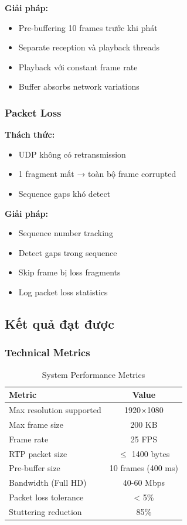 \textbf{Giải pháp:}
\begin{itemize}
    \item Pre-buffering 10 frames trước khi phát
    \item Separate reception và playback threads
    \item Playback với constant frame rate
    \item Buffer absorbs network variations
\end{itemize}

\subsubsection{Packet Loss}

\textbf{Thách thức:}
\begin{itemize}
    \item UDP không có retransmission
    \item 1 fragment mất → toàn bộ frame corrupted
    \item Sequence gaps khó detect
\end{itemize}

\textbf{Giải pháp:}
\begin{itemize}
    \item Sequence number tracking
    \item Detect gaps trong sequence
    \item Skip frame bị loss fragments
    \item Log packet loss statistics
\end{itemize}

\subsection{Kết quả đạt được}

\subsubsection{Technical Metrics}

\begin{table}[H]
\centering
\begin{tabular}{|l|c|}
\hline
\textbf{Metric} & \textbf{Value} \\
\hline
Max resolution supported & 1920$\times$1080 \\
Max frame size & 200 KB \\
Frame rate & 25 FPS \\
RTP packet size & $\leq$ 1400 bytes \\
Pre-buffer size & 10 frames (400 ms) \\
Bandwidth (Full HD) & 40-60 Mbps \\
Packet loss tolerance & < 5\% \\
Stuttering reduction & 85\% \\
\hline
\end{tabular}
\caption{System Performance Metrics}
\end{table}

